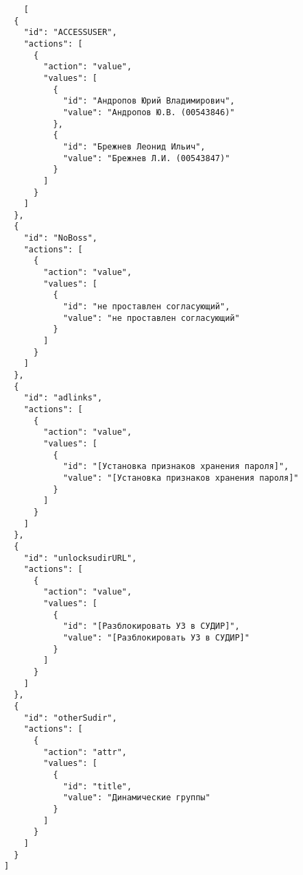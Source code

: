 \documentclass[../index.tex]{subfiles}
\begin{document}
\begin{verbatim}
    [
  {
    "id": "ACCESSUSER",
    "actions": [
      {
        "action": "value",
        "values": [
          {
            "id": "Андропов Юрий Владимирович",
            "value": "Андропов Ю.В. (00543846)"
          },
          {
            "id": "Брежнев Леонид Ильич",
            "value": "Брежнев Л.И. (00543847)"
          }
        ]
      }
    ]
  },
  {
    "id": "NoBoss",
    "actions": [
      {
        "action": "value",
        "values": [
          {
            "id": "не проставлен согласующий",
            "value": "не проставлен согласующий"
          }
        ]
      }
    ]
  },
  {
    "id": "adlinks",
    "actions": [
      {
        "action": "value",
        "values": [
          {
            "id": "[Установка признаков хранения пароля]",
            "value": "[Установка признаков хранения пароля]"
          }
        ]
      }
    ]
  },
  {
    "id": "unlocksudirURL",
    "actions": [
      {
        "action": "value",
        "values": [
          {
            "id": "[Разблокировать УЗ в СУДИР]",
            "value": "[Разблокировать УЗ в СУДИР]"
          }
        ]
      }
    ]
  },
  {
    "id": "otherSudir",
    "actions": [
      {
        "action": "attr",
        "values": [
          {
            "id": "title",
            "value": "Динамические группы"
          }
        ]
      }
    ]
  }
]
\end{verbatim}
\end{document}
